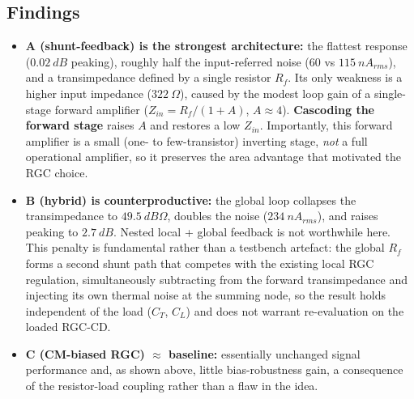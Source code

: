 \documentclass{article}
\begin{document}
\subsection{Findings}
\begin{itemize}
    \item \textbf{A (shunt-feedback) is the strongest architecture:} the flattest
    response ($0.02\ dB$ peaking), roughly half the input-referred noise
    ($60$ vs $115\ nA_{rms}$), and a transimpedance defined by a single resistor
    $R_f$. Its only weakness is a higher input impedance ($322\ \Omega$), caused by
    the modest loop gain of a single-stage forward amplifier
    ($Z_{in}=R_f/(1+A)$, $A\approx4$). \textbf{Cascoding the forward stage} raises
    $A$ and restores a low $Z_{in}$. Importantly, this forward amplifier is a small
    (one- to few-transistor) inverting stage, \emph{not} a full operational
    amplifier, so it preserves the area advantage that motivated the RGC choice.
    \item \textbf{B (hybrid) is counterproductive:} the global loop collapses the
    transimpedance to $49.5\ dB\Omega$, doubles the noise ($234\ nA_{rms}$), and
    raises peaking to $2.7\ dB$. Nested local + global feedback is not worthwhile
    here. This penalty is fundamental rather than a testbench artefact: the global
    $R_f$ forms a second shunt path that competes with the existing local RGC
    regulation, simultaneously subtracting from the forward transimpedance and
    injecting its own thermal noise at the summing node, so the result holds
    independent of the load ($C_T$, $C_L$) and does not warrant re-evaluation on the
    loaded RGC-CD.
    \item \textbf{C (CM-biased RGC) $\approx$ baseline:} essentially unchanged
    signal performance and, as shown above, little bias-robustness gain, a
    consequence of the resistor-load coupling rather than a flaw in the idea.
\end{itemize}



\end{document}
